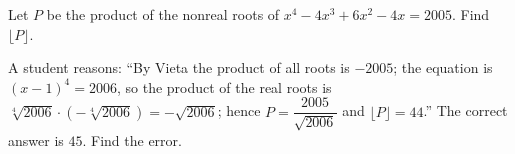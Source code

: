 Let $P$ be the product of the nonreal roots of $x^4-4x^3+6x^2-4x=2005$. Find $\lfloor P\rfloor$.

A student reasons: ``By Vieta the product of all roots is $-2005$; the equation is $(x-1)^4=2006$, so the product of the real roots is $\sqrt[4]{2006}\cdot\left(-\sqrt[4]{2006}\right)=-\sqrt{2006}$; hence $P=\dfrac{2005}{\sqrt{2006}}$ and $\lfloor P\rfloor=44$.'' The correct answer is $45$. Find the error.
